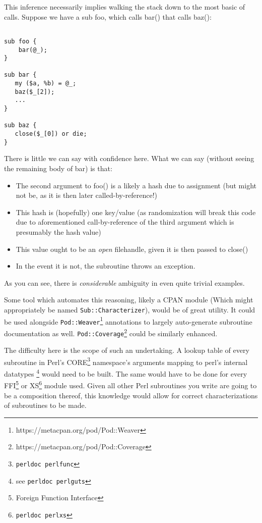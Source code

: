\documentclass{article}
\begin{document}
This inference necessarily implies walking the stack down to the most basic of calls.
Suppose we have a sub foo, which calls bar() that calls baz():

\begin{lstlisting}

sub foo {
    bar(@_);
}

sub bar {
   my ($a, %b) = @_;
   baz($_[2]);
   ...
}

sub baz {
   close($_[0]) or die;
}

\end{lstlisting}

There is little we can say with confidence here.
What we can say (without seeing the remaining body of bar) is that:
\begin{itemize}
\item The second argument to foo() is a likely a hash due to assignment (but might not be, as it is then later called-by-reference!)
\item This hash is (hopefully) one key/value (as randomization will break this code due to aforementioned call-by-reference of the third argument which is presumably the hash value)
\item This value ought to be an \textit{open} filehandle, given it is then passed to close()
\item In the event it is not, the subroutine throws an exception.
\end{itemize}
As you can see, there is \textit{considerable} ambiguity in even quite trivial examples.

Some tool which automates this reasoning, likely a CPAN module (Which might appropriately be named \texttt{Sub::Characterizer}), would be of great utility.
It could be used alongside \texttt{Pod::Weaver}\footnote{https://metacpan.org/pod/Pod::Weaver} annotations to largely auto-generate subroutine documentation as well.
\texttt{Pod::Coverage}\footnote{https://metacpan.org/pod/Pod::Coverage} could be similarly enhanced.

The difficulty here is the scope of such an undertaking.
A lookup table of every subroutine in Perl's CORE\footnote{\texttt{perldoc perlfunc}} namespace's arguments mapping to perl's internal datatypes \footnote{see \texttt{perldoc perlguts}} would need to be built.
The same would have to be done for every FFI\footnote{Foreign Function Interface} or XS\footnote{\texttt{perldoc perlxs}} module used.
Given all other Perl subroutines you write are going to be a composition thereof, this knowledge would allow for correct characterizations of subroutines to be made.
\end{document}
